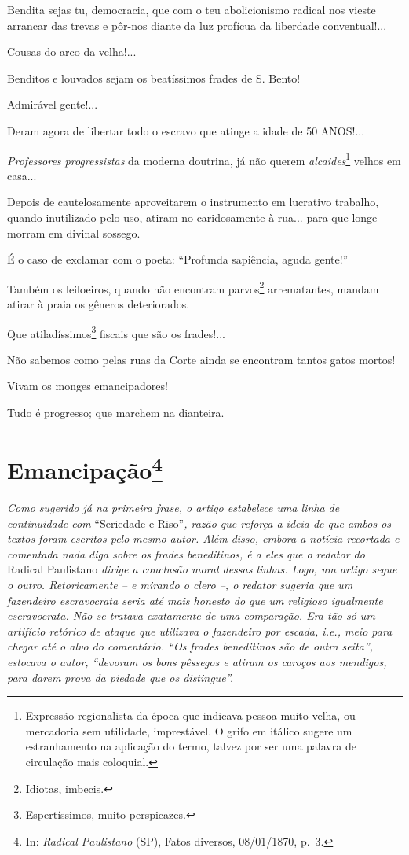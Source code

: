 Bendita sejas tu, democracia, que com o teu abolicionismo radical nos
vieste arrancar das trevas e pôr-nos diante da luz profícua da liberdade
conventual!...

Cousas do arco da velha!...

Benditos e louvados sejam os beatíssimos frades de S. Bento!

Admirável gente!...

Deram agora de libertar todo o escravo que atinge a idade de 50 ANOS!...

\emph{Professores progressistas} da moderna doutrina, já não querem
\emph{alcaides}\footnote{ Expressão regionalista da época que indicava
  pessoa muito velha, ou mercadoria sem utilidade, imprestável. O grifo
  em itálico sugere um estranhamento na aplicação do termo, talvez por
  ser uma palavra de circulação mais coloquial.} velhos em casa...

Depois de cautelosamente aproveitarem o instrumento em lucrativo
trabalho, quando inutilizado pelo uso, atiram-no caridosamente à rua...
para que longe morram em divinal sossego.

É o caso de exclamar com o poeta: ``Profunda sapiência, aguda gente!''

Também os leiloeiros, quando não encontram parvos\footnote{ Idiotas,
  imbecis.} arrematantes, mandam atirar à praia os gêneros deteriorados.

Que atiladíssimos\footnote{ Espertíssimos, muito perspicazes.} fiscais
que são os frades!...

Não sabemos como pelas ruas da Corte ainda se encontram tantos gatos
mortos!

Vivam os monges emancipadores!

Tudo é progresso; que marchem na dianteira.

\chapter{Emancipação\footnote{ In: \emph{Radical Paulistano} (SP), Fatos diversos,
  08/01/1870, p.~3.}} %

\begin{didascalia}
\emph{Como sugerido já na primeira frase, o artigo estabelece uma linha
de continuidade com} ``Seriedade e Riso''\emph{, razão que reforça a ideia
de que ambos os textos foram escritos pelo mesmo autor. Além disso,
embora a notícia recortada e comentada nada diga sobre os frades
beneditinos, é a eles que o redator do} Radical Paulistano \emph{dirige
a conclusão moral dessas linhas. Logo, um artigo segue o outro.
Retoricamente -- e mirando o clero --, o redator sugeria que um
fazendeiro escravocrata seria até mais honesto do que um religioso
igualmente escravocrata. Não se tratava exatamente de uma comparação.
Era tão só um artifício retórico de ataque que utilizava o fazendeiro
por escada, i.e., meio para chegar até o alvo do comentário. ``Os frades
beneditinos são de outra seita'', estocava o autor, ``devoram os bons
pêssegos e atiram os caroços aos mendigos, para darem prova da piedade
que os distingue''.}
\end{didascalia}

